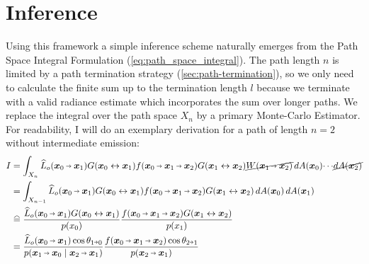\section{Inference}
\label{sec:inference}
Using this framework a simple inference scheme naturally emerges from the Path Space Integral Formulation (\autoref{eq:path_space_integral}).
The path length $n$ is limited by a path termination strategy (\autoref{sec:path-termination}), so we only need to calculate the finite sum up to the termination length $l$ because we terminate with a valid radiance estimate which incorporates the sum over longer paths.
We replace the integral over the path space $X_n$ by a primary Monte-Carlo Estimator.
For readability, I will do an exemplary derivation for a path of length $n=2$ without intermediate emission:
\begin{subequations}
\begin{align}
    I
    &= \int_{X_n} \widehat{L}_o(\pdir{0}{1}) \G{0}{1} \f{0}{1}{2} \G{1}{2} \cancel{W(\pdir{1}{2})} \diff A(\vec{x}_0) \!\cdots\! \cancel{\diff A(\vec{x}_2)}\notag\\
    &= \int_{X_{n-1}} \widehat{L}_o(\pdir{0}{1}) \G{0}{1} \f{0}{1}{2} \G{1}{2} \diff A(\vec{x}_0) \diff A(\vec{x}_1) \label{eq:cancelw}\\
    &\eqhat \frac{\widehat{L}_o(\pdir{0}{1}) \G{0}{1}}{p(x_0)}  \frac{\f{0}{1}{2} \G{1}{2}}{p(x_1)} \label{eq:pmc}\\
    &= \frac{\widehat{L}_o(\pdir{0}{1}) \cos\theta_{1\veryshortarrow0}}{p(\pdir{1}{0}\mid\pdir{2}{1})}  \frac{\f{0}{1}{2} \cos\theta_{2\veryshortarrow1}}{p(\pdir{2}{1})} \label{eq:area2solid}
\end{align} %
\end{subequations}
